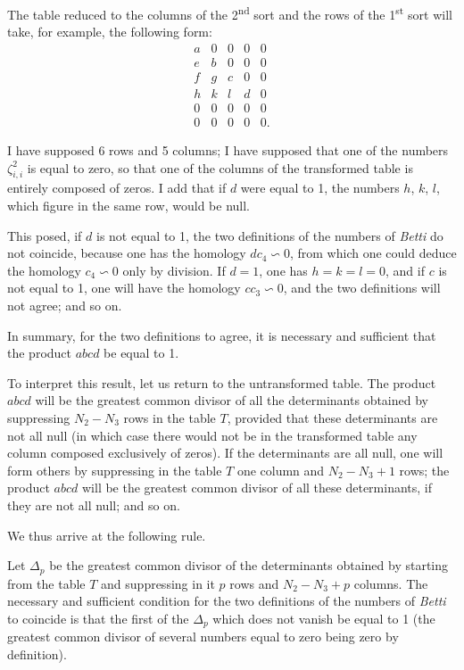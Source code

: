 \documentclass{article}
\begin{document}
The table reduced to the columns of the 2\textsuperscript{nd} sort and the rows of the 1\textsuperscript{st} sort will take, for example, the following form:
\[ \begin{matrix} a & 0 & 0 & 0 & 0 \\[1ex] e & b & 0 & 0 & 0 \\[1ex] f & g & c & 0 & 0 \\[1ex] h & k & l & d & 0 \\[1ex] 0 & 0 & 0 & 0 & 0 \\[1ex] 0 & 0 & 0 & 0 & 0. \end{matrix} \]


I have supposed 6 rows and 5 columns; I have supposed that one of the numbers $\zeta^{2}_{i,i}$ is equal to zero, so that one of the columns of the transformed table is entirely composed of zeros. I add that if $d$ were equal to 1, the numbers $h$, $k$, $l$, which figure in the same row, would be null.

This posed, if $d$ is not equal to 1, the two definitions of the numbers of \emph{Betti} do not coincide, because one has the homology $dc_{4} \backsim 0$, from which one could deduce the homology $c_{4} \backsim 0$ only by division. If $d = 1$, one has $h = k = l = 0$, and if $c$ is not equal to 1, one will have the homology $cc_{3} \backsim 0$, and the two definitions will not agree; and so on.

In summary, for the two definitions to agree, it is necessary and sufficient that the product $abcd$ be equal to 1.

To interpret this result, let us return to the untransformed table. The product $abcd$ will be the greatest common divisor of all the determinants obtained by suppressing $N_{2} - N_{3}$ rows in the table $T$, provided that these determinants are not all null (in which case there would not be in the transformed table any column composed exclusively of zeros). If the determinants are all null, one will form others by suppressing in the table $T$ one column and $N_{2} - N_{3} + 1$ rows; the product $abcd$ will be the greatest common divisor of all these determinants, if they are not all null; and so on.

We thus arrive at the following rule.

Let $\Delta_{p}$ be the greatest common divisor of the determinants obtained by starting from the table $T$ and suppressing in it $p$ rows and $N_{2} - N_{3} + p$ columns. The necessary and sufficient condition for the two definitions of the numbers of \emph{Betti} to coincide is that the first of the $\Delta_{p}$ which does not vanish be equal to 1 (the greatest common divisor of several numbers equal to zero being zero by definition).
\end{document}
